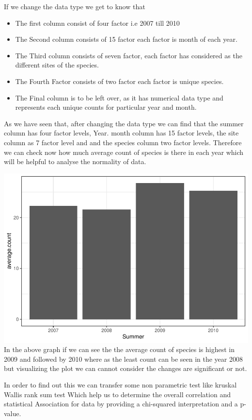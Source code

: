 \documentclass[
]{article}
\providecommand{\tightlist}{%
  \setlength{\itemsep}{0pt}\setlength{\parskip}{0pt}}
\begin{document}
If we change the data type we get to know that

\begin{itemize}
\tightlist
\item
  The first column consist of four factor i.e 2007 till 2010
\item
  The Second column consists of 15 factor each factor is month of each
  year.
\item
  The Third column consists of seven factor, each factor has considered
  as the different sites of the species.
\item
  The Fourth Factor consists of two factor each factor is unique
  species.
\item
  The Final column is to be left over, as it has numerical data type and
  represents each unique counts for particular year and month.
\end{itemize}

As we have seen that, after changing the data type we can find that the
summer column has four factor levels, Year. month column has 15 factor
levels, the site column as 7 factor level and and the species column two
factor levels. Therefore we can check now how much average count of
species is there in each year which will be helpful to analyse the
normality of data.

\includegraphics{Statistical-analysis-in-RStudio_files/figure-latex/unnamed-chunk-5-1.pdf}
In the above graph if we can see the the average count of species is
highest in 2009 and followed by 2010 where as the least count can be
seen in the year 2008 but visualizing the plot we can cannot consider
the changes are significant or not.

In order to find out this we can transfer some non parametric test like
kruskal Wallis rank sum test Which help us to determine the overall
correlation and statistical Association for data by providing a
chi-squared interpretation and a p-value.
\end{document}
